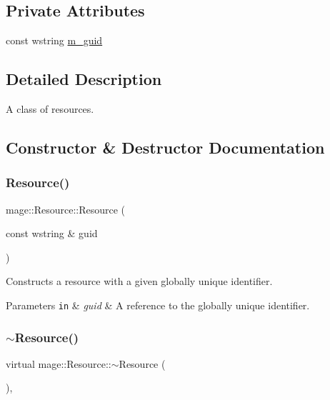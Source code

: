 \subsection*{Private Attributes}
\begin{DoxyCompactItemize}
\item 
const wstring \hyperlink{classmage_1_1_resource_aa5e176b2528581bf1b662f5a77aeef40}{m\+\_\+guid}
\end{DoxyCompactItemize}


\subsection{Detailed Description}
A class of resources. 

\subsection{Constructor \& Destructor Documentation}
\hypertarget{classmage_1_1_resource_a3e2540455d88e1825a680fb4e7fe25c4}{}\label{classmage_1_1_resource_a3e2540455d88e1825a680fb4e7fe25c4} 
\subsubsection{\texorpdfstring{Resource()}{Resource()}\hspace{0.1cm}{\footnotesize\ttfamily [1/3]}}
{\footnotesize\ttfamily mage\+::\+Resource\+::\+Resource (\begin{DoxyParamCaption}\item[{const wstring \&}]{guid }\end{DoxyParamCaption})}

Constructs a resource with a given globally unique identifier.


\begin{DoxyParams}[1]{Parameters}
\mbox{\tt in}  & {\em guid} & A reference to the globally unique identifier. \\
\hline
\end{DoxyParams}
\hypertarget{classmage_1_1_resource_a26cea6261aac321d95ac745703f1a3e8}{}\label{classmage_1_1_resource_a26cea6261aac321d95ac745703f1a3e8} 
\subsubsection{\texorpdfstring{$\sim$\+Resource()}{~Resource()}}
{\footnotesize\ttfamily virtual mage\+::\+Resource\+::$\sim$\+Resource (\begin{DoxyParamCaption}{ }\end{DoxyParamCaption})\hspace{0.3cm}{\ttfamily [virtual]}, {\ttfamily [default]}}

